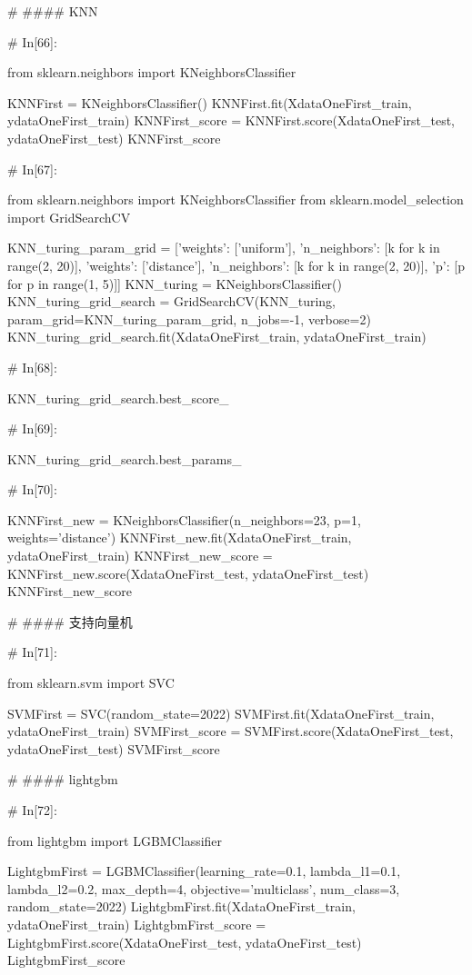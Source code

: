 \documentclass{MathorCupmodeling}
\begin{document}
\begin{python}
	# #### KNN
	
	# In[66]:
	
	
	from sklearn.neighbors import KNeighborsClassifier
	
	KNNFirst = KNeighborsClassifier()
	KNNFirst.fit(XdataOneFirst_train, ydataOneFirst_train)
	KNNFirst_score = KNNFirst.score(XdataOneFirst_test, ydataOneFirst_test)
	KNNFirst_score
	
	# In[67]:
	
	
	from sklearn.neighbors import KNeighborsClassifier
	from sklearn.model_selection import GridSearchCV
	
	KNN_turing_param_grid = [{'weights': ['uniform'],
							  'n_neighbors': [k for k in range(2, 20)]},
							 {'weights': ['distance'],
							  'n_neighbors': [k for k in range(2, 20)],
							  'p': [p for p in range(1, 5)]}]
	KNN_turing = KNeighborsClassifier()
	KNN_turing_grid_search = GridSearchCV(KNN_turing,
										  param_grid=KNN_turing_param_grid,
										  n_jobs=-1,
										  verbose=2)
	KNN_turing_grid_search.fit(XdataOneFirst_train, ydataOneFirst_train)
	
	# In[68]:
	
	
	KNN_turing_grid_search.best_score_
	
	# In[69]:
	
	
	KNN_turing_grid_search.best_params_
	
	# In[70]:
	
	
	KNNFirst_new = KNeighborsClassifier(n_neighbors=23, p=1, weights='distance')
	KNNFirst_new.fit(XdataOneFirst_train, ydataOneFirst_train)
	KNNFirst_new_score = KNNFirst_new.score(XdataOneFirst_test, ydataOneFirst_test)
	KNNFirst_new_score
	
	# #### 支持向量机
	
	# In[71]:
	
	
	from sklearn.svm import SVC
	
	SVMFirst = SVC(random_state=2022)
	SVMFirst.fit(XdataOneFirst_train, ydataOneFirst_train)
	SVMFirst_score = SVMFirst.score(XdataOneFirst_test, ydataOneFirst_test)
	SVMFirst_score
	
	# #### lightgbm
	
	# In[72]:
	
	
	from lightgbm import LGBMClassifier
	
	LightgbmFirst = LGBMClassifier(learning_rate=0.1,
								   lambda_l1=0.1,
								   lambda_l2=0.2,
								   max_depth=4,
								   objective='multiclass',
								   num_class=3,
								   random_state=2022)
	LightgbmFirst.fit(XdataOneFirst_train, ydataOneFirst_train)
	LightgbmFirst_score = LightgbmFirst.score(XdataOneFirst_test, ydataOneFirst_test)
	LightgbmFirst_score
	

\end{python}
\end{document}
